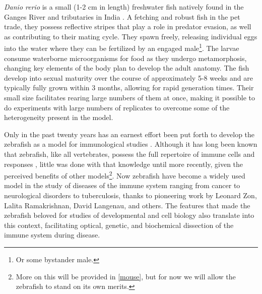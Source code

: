 \textit{Danio rerio} is a small (1\hyp{}2 cm in length) freshwater fish natively found in the Ganges River and tributaries in India \citep{Engeszer2007, Arunachalam2013, Parichy2015}. A fetching and robust fish in the pet trade, they possess reflective stripes that play a role in predator evasion, as well as contributing to their mating cycle. They spawn freely, releasing individual eggs into the water where they can be fertilized by an engaged male\footnote{Or some bystander male.}. The larvae consume waterborne microorganisms for food as they undergo metamorphosis, changing key elements of the body plan to develop the adult anatomy. The fish develop into sexual maturity over the course of approximately 5\hyp{}8 weeks and are typically fully grown within 3 months, allowing for rapid generation times. Their small size facilitates rearing large numbers of them at once, making it possible to do experiments with large numbers of replicates to overcome some of the heterogeneity present in the model.

Only in the past twenty years has an earnest effort been put forth to develop the zebrafish as a model for immunological studies \citep{Hsu2004, Davis2002, Langenau2003}. Although it has long been known that zebrafish, like all vertebrates, possess the full repertoire of immune cells and responses \citep{LugoVillarino2010, Liongue2009}, little was done with that knowledge until more recently, given the perceived benefits of other models\footnote{More on this will be provided in \autoref{mouse}, but for now we will allow the zebrafish to stand on its own merits.}. Now zebrafish have become a widely used model in the study of diseases of the immune system ranging from cancer to neurological disorders to tuberculosis, thanks to pioneering work by Leonard Zon, Lalita Ramakrishnan, David Langenau, and others. The features that made the zebrafish beloved for studies of developmental and cell biology also translate into this context, facilitating optical, genetic, and biochemical dissection of the immune system during disease.

